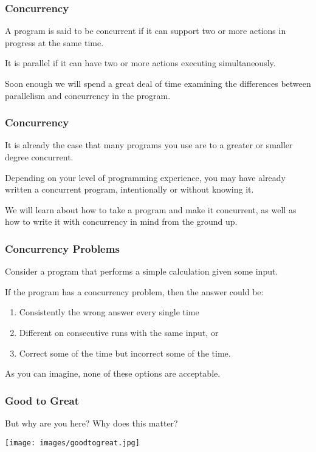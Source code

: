 \begin{frame}
	\frametitle{Concurrency}
	A program is said to be concurrent if it can support two or more actions in progress at the same time.

	It is parallel if it can have two or more actions executing simultaneously.

	Soon enough we will spend a great deal of time examining the differences between parallelism and concurrency in the program.

\end{frame}

\begin{frame}
	\frametitle{Concurrency}

	It is already the case that many programs you use are to a greater or smaller degree concurrent.

	Depending on your level of programming experience, you may have already written a concurrent program, intentionally or without knowing it.

	We will learn about how to take a program and make it concurrent, as well as how to write it with concurrency in mind from the ground up.

\end{frame}


\begin{frame}
	\frametitle{Concurrency Problems}

	Consider a program that performs a simple calculation given some input.

	If the program has a concurrency problem,  then the answer could be:

	\begin{enumerate}
		\item Consistently the wrong answer every single time
		\item Different on consecutive runs with the same input, or
		\item Correct some of the time but incorrect some of the time.
	\end{enumerate}

	As you can imagine, none of these options are acceptable.

\end{frame}


\begin{frame}
\frametitle{Good to Great}

But why are you here? Why does this matter?

\begin{center}
	\texttt{[image: images/goodtogreat.jpg]}
\end{center}

\end{frame}


